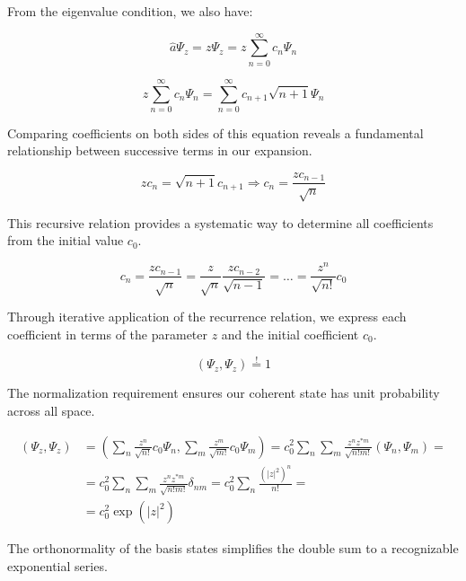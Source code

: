 \documentclass[italian]{HKNdocument}
\begin{document}
From the eigenvalue condition, we also have:

\begin{equation}
\hat{a} \Psi_{z}=z \Psi_{z}=z \sum_{n=0}^{\infty} c_{n} \Psi_{n}
\end{equation}

\begin{equation}
z \sum_{n=0}^{\infty} c_{n} \Psi_{n}=\sum_{n=0}^{\infty} c_{n+1} \sqrt{n+1} \Psi_{n}
\end{equation}

Comparing coefficients on both sides of this equation reveals a fundamental relationship between successive terms in our expansion.

\begin{equation}
z c_{n}=\sqrt{n+1} c_{n+1} \Longrightarrow c_{n}=\frac{z c_{n-1}}{\sqrt{n}}
\end{equation}

This recursive relation provides a systematic way to determine all coefficients from the initial value $c_0$.

\begin{equation}
c_{n}=\frac{z c_{n-1}}{\sqrt{n}}=\frac{z}{\sqrt{n}} \frac{z c_{n-2}}{\sqrt{n-1}}=\ldots=\frac{z^{n}}{\sqrt{n!}} c_{0}
\end{equation}

Through iterative application of the recurrence relation, we express each coefficient in terms of the parameter $z$ and the initial coefficient $c_0$.

\begin{equation}
\left(\Psi_{z}, \Psi_{z}\right) \stackrel{!}{=} 1
\end{equation}

The normalization requirement ensures our coherent state has unit probability across all space.

\begin{align}
\left(\Psi_{z}, \Psi_{z}\right) & =\left(\sum_{n} \frac{z^{n}}{\sqrt{n!}} c_{0} \Psi_{n}, \sum_{m} \frac{z^{m}}{\sqrt{m!}} c_{0} \Psi_{m}\right)=c_{0}^{2} \sum_{n} \sum_{m} \frac{z^{n} z^{* m}}{\sqrt{n!m!}}\left(\Psi_{n}, \Psi_{m}\right)= \\
& =c_{0}^{2} \sum_{n} \sum_{m} \frac{z^{n} z^{* m}}{\sqrt{n!m!}} \delta_{n m}=c_{0}^{2} \sum_{n} \frac{\left(|z|^{2}\right)^{n}}{n!}= \\
& =c_{0}^{2} \exp \left(|z|^{2}\right)
\end{align}

The orthonormality of the basis states simplifies the double sum to a recognizable exponential series.
\end{document}
